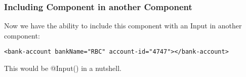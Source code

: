 
\subsubsection{ Including Component in another Component }
Now we have the ability to include this component with an Input in another
component:
\begin{lstlisting}
<bank-account bankName="RBC" account-id="4747"></bank-account>
\end{lstlisting}

This would be @Input() in a nutshell. 

